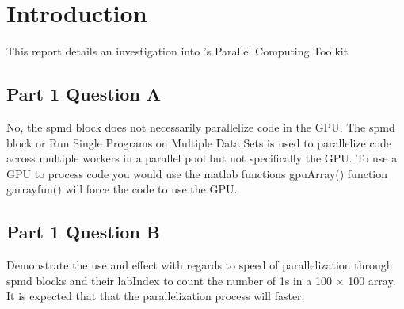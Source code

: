 \section{Introduction}
This report details an investigation into \MATLAB's Parallel Computing Toolkit 

\subsection{Part 1 Question A}
No, the spmd block does not necessarily parallelize code in the GPU.
The spmd block or Run Single Programs on Multiple Data Sets is used to parallelize code across multiple workers in a parallel pool but not specifically the GPU. To use a GPU to process code you would use the matlab functions gpuArray() function garrayfun() will force the code to use the GPU.

\subsection{Part 1 Question B}
Demonstrate the use and effect with regards to speed of parallelization through spmd blocks and their labIndex to count the number of 1s in a 100 × 100 array.
It is expected that that the parallelization process will faster.